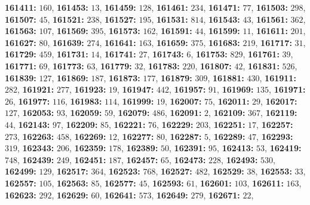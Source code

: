 \textsf{\bfseries 161411:} $160$, \textsf{\bfseries 161453:} $13$, \textsf{\bfseries 161459:} $128$, \textsf{\bfseries 161461:} $234$, \textsf{\bfseries 161471:} $77$, \textsf{\bfseries 161503:} $298$, \textsf{\bfseries 161507:} $45$, \textsf{\bfseries 161521:} $238$, \textsf{\bfseries 161527:} $195$, \textsf{\bfseries 161531:} $814$, \textsf{\bfseries 161543:} $43$, \textsf{\bfseries 161561:} $362$, \textsf{\bfseries 161563:} $107$, \textsf{\bfseries 161569:} $395$, \textsf{\bfseries 161573:} $162$, \textsf{\bfseries 161591:} $44$, \textsf{\bfseries 161599:} $11$, \textsf{\bfseries 161611:} $201$, \textsf{\bfseries 161627:} $80$, \textsf{\bfseries 161639:} $274$, \textsf{\bfseries 161641:} $163$, \textsf{\bfseries 161659:} $375$, \textsf{\bfseries 161683:} $219$, \textsf{\bfseries 161717:} $31$, \textsf{\bfseries 161729:} $459$, \textsf{\bfseries 161731:} $14$, \textsf{\bfseries 161741:} $27$, \textsf{\bfseries 161743:} $6$, \textsf{\bfseries 161753:} $829$, \textsf{\bfseries 161761:} $39$, \textsf{\bfseries 161771:} $69$, \textsf{\bfseries 161773:} $63$, \textsf{\bfseries 161779:} $32$, \textsf{\bfseries 161783:} $220$, \textsf{\bfseries 161807:} $42$, \textsf{\bfseries 161831:} $526$, \textsf{\bfseries 161839:} $127$, \textsf{\bfseries 161869:} $187$, \textsf{\bfseries 161873:} $177$, \textsf{\bfseries 161879:} $309$, \textsf{\bfseries 161881:} $430$, \textsf{\bfseries 161911:} $282$, \textsf{\bfseries 161921:} $277$, \textsf{\bfseries 161923:} $19$, \textsf{\bfseries 161947:} $442$, \textsf{\bfseries 161957:} $91$, \textsf{\bfseries 161969:} $135$, \textsf{\bfseries 161971:} $26$, \textsf{\bfseries 161977:} $116$, \textsf{\bfseries 161983:} $114$, \textsf{\bfseries 161999:} $19$, \textsf{\bfseries 162007:} $75$, \textsf{\bfseries 162011:} $29$, \textsf{\bfseries 162017:} $127$, \textsf{\bfseries 162053:} $93$, \textsf{\bfseries 162059:} $59$, \textsf{\bfseries 162079:} $486$, \textsf{\bfseries 162091:} $2$, \textsf{\bfseries 162109:} $367$, \textsf{\bfseries 162119:} $44$, \textsf{\bfseries 162143:} $97$, \textsf{\bfseries 162209:} $85$, \textsf{\bfseries 162221:} $76$, \textsf{\bfseries 162229:} $203$, \textsf{\bfseries 162251:} $17$, \textsf{\bfseries 162257:} $273$, \textsf{\bfseries 162263:} $458$, \textsf{\bfseries 162269:} $12$, \textsf{\bfseries 162277:} $80$, \textsf{\bfseries 162287:} $5$, \textsf{\bfseries 162289:} $47$, \textsf{\bfseries 162293:} $319$, \textsf{\bfseries 162343:} $206$, \textsf{\bfseries 162359:} $178$, \textsf{\bfseries 162389:} $50$, \textsf{\bfseries 162391:} $95$, \textsf{\bfseries 162413:} $53$, \textsf{\bfseries 162419:} $748$, \textsf{\bfseries 162439:} $249$, \textsf{\bfseries 162451:} $187$, \textsf{\bfseries 162457:} $65$, \textsf{\bfseries 162473:} $228$, \textsf{\bfseries 162493:} $530$, \textsf{\bfseries 162499:} $129$, \textsf{\bfseries 162517:} $364$, \textsf{\bfseries 162523:} $768$, \textsf{\bfseries 162527:} $482$, \textsf{\bfseries 162529:} $38$, \textsf{\bfseries 162553:} $33$, \textsf{\bfseries 162557:} $105$, \textsf{\bfseries 162563:} $85$, \textsf{\bfseries 162577:} $45$, \textsf{\bfseries 162593:} $61$, \textsf{\bfseries 162601:} $103$, \textsf{\bfseries 162611:} $163$, \textsf{\bfseries 162623:} $292$, \textsf{\bfseries 162629:} $60$, \textsf{\bfseries 162641:} $573$, \textsf{\bfseries 162649:} $279$, \textsf{\bfseries 162671:} $22$, 
